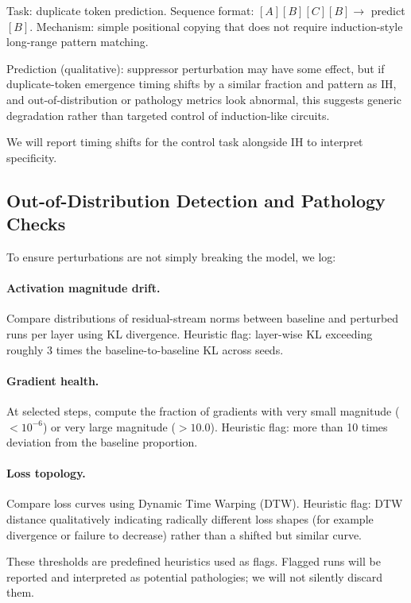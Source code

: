 \documentclass[11pt]{article}
\begin{document}
Task: duplicate token prediction. Sequence format: $[A][B][C][B] \rightarrow$ predict $[B]$. Mechanism: simple positional copying that does not require induction-style long-range pattern matching.

Prediction (qualitative): suppressor perturbation may have some effect, but if duplicate-token emergence timing shifts by a similar fraction and pattern as IH, and out-of-distribution or pathology metrics look abnormal, this suggests generic degradation rather than targeted control of induction-like circuits.

We will report timing shifts for the control task alongside IH to interpret specificity.

\subsection{Out-of-Distribution Detection and Pathology Checks}
\label{sec:ood}

To ensure perturbations are not simply breaking the model, we log:

\paragraph{Activation magnitude drift.}
Compare distributions of residual-stream norms between baseline and perturbed runs per layer using KL divergence. Heuristic flag: layer-wise KL exceeding roughly 3 times the baseline-to-baseline KL across seeds.

\paragraph{Gradient health.}
At selected steps, compute the fraction of gradients with very small magnitude ($< 10^{-6}$) or very large magnitude ($> 10.0$). Heuristic flag: more than 10 times deviation from the baseline proportion.

\paragraph{Loss topology.}
Compare loss curves using Dynamic Time Warping (DTW). Heuristic flag: DTW distance qualitatively indicating radically different loss shapes (for example divergence or failure to decrease) rather than a shifted but similar curve.

These thresholds are predefined heuristics used as flags. Flagged runs will be reported and interpreted as potential pathologies; we will not silently discard them.
\end{document}
